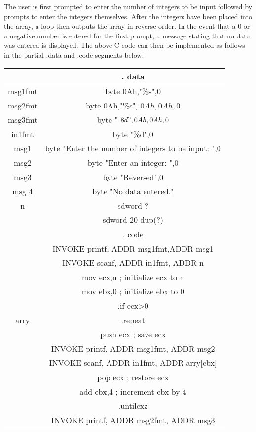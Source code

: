 \documentclass[10pt]{article}
\begin{document}
The user is first prompted to enter the number of integers to be input followed by prompts to enter the integers themselves. After the integers have been placed into the array, a loop then outputs the array in reverse order. In the event that a 0 or a negative number is entered for the first prompt, a message stating that no data was entered is displayed. The above C code can then be implemented as follows in the partial .data and .code segments below:

\begin{center}
\begin{tabular}{|c|c|}
\hline
 & . data \\
\hline
msg1fmt & byte 0Ah,"\%s",0 \\
\hline
msg2fmt & byte 0Ah,"\%s", $0 A h, 0 A h, 0$ \\
\hline
msg3fmt & byte " $8 d ", 0 A h, 0 A h, 0$ \\
\hline
in1fmt & byte "\%d",0 \\
\hline
msg1 & byte "Enter the number of integers to be input: ",0 \\
\hline
msg2 & byte "Enter an integer: ",0 \\
\hline
msg3 & byte "Reversed",0 \\
\hline
msg 4 & byte "No data entered." \\
\hline
n & sdword ? \\
\hline
\multirow[t]{25}{*}{arry} & sdword 20 dup(?) \\
\hline
 & . code \\
\hline
 & INVOKE printf, ADDR msg1fmt,ADDR msg1 \\
\hline
 & INVOKE scanf, ADDR in1fmt, ADDR n \\
\hline
 & mov ecx,n ; initialize ecx to n \\
\hline
 & mov ebx,0 ; initialize ebx to 0 \\
\hline
 & .if ecx>0 \\
\hline
 & .repeat \\
\hline
 & push ecx ; save ecx \\
\hline
 & INVOKE printf, ADDR msg1fmt, ADDR msg2 \\
\hline
 & INVOKE scanf, ADDR in1fmt, ADDR arry[ebx] \\
\hline
 & pop ecx ; restore ecx \\
\hline
 & add ebx,4 ; increment ebx by 4 \\
\hline
 & .untilcxz \\
\hline
 & INVOKE printf, ADDR msg2fmt, ADDR msg3 \\

\end{tabular}
\end{center}
\end{document}
